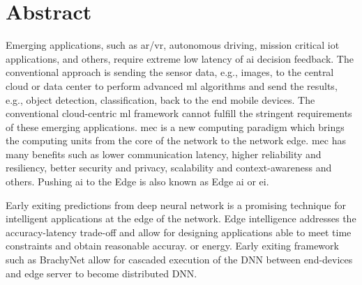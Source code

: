 
    \hypertarget{abstract}{%
    \chapter*{Abstract}\label{sec:abstract}}
    \textcolor{caption-color}{Emerging applications, such as \gls{ar}/\gls{vr}, autonomous driving, mission critical \gls{iot} applications, and others, require extreme low latency of \gls{ai} decision feedback. The conventional approach is sending the sensor data, e.g., images, to the central cloud or data center to perform advanced \gls{ml} algorithms and send the results, e.g., object detection, classification, back to the end mobile devices. The conventional cloud-centric \gls{ml} framework cannot fulfill the stringent requirements of these emerging applications. \gls{mec} is a new computing paradigm which brings the computing units from the core of the network to the network edge. \gls{mec} has many benefits such as lower communication latency, higher reliability and resiliency, better security and privacy, scalability and context-awareness and others. Pushing \gls{ai} to the Edge is also known as Edge \gls{ai} or \gls{ei}.}

	Early exiting predictions from deep neural network is a promising technique for intelligent applications at the edge of the network. Edge intelligence addresses the accuracy-latency trade-off and allow for designing applications able to meet time constraints and obtain reasonable accuray.  or energy. Early exiting framework such as BrachyNet allow for cascaded  execution of the DNN between end-devices and edge server to become distributed DNN.  